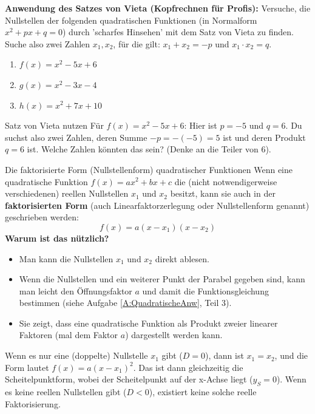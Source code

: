 \begin{aufgabenumgebung}
        \textbf{Anwendung des Satzes von Vieta (Kopfrechnen für Profis):}
        Versuche, die Nullstellen der folgenden quadratischen Funktionen (in Normalform $x^2+px+q=0$) durch 'scharfes Hinsehen' mit dem Satz von Vieta zu finden. Suche also zwei Zahlen $x_1, x_2$, für die gilt: $x_1+x_2 = -p$ und $x_1 \cdot x_2 = q$.
        \begin{enumerate}[label=(\alph*)]
            \item $f(x) = x^2 - 5x + 6$
            \item $g(x) = x^2 - 3x - 4$
            \item $h(x) = x^2 + 7x + 10$
        \end{enumerate}
        \begin{tippumgebung}{Satz von Vieta nutzen}
        Für $f(x) = x^2 - 5x + 6$: Hier ist $p=-5$ und $q=6$. Du suchst also zwei Zahlen, deren Summe $-p = -(-5) = 5$ ist und deren Produkt $q=6$ ist. Welche Zahlen könnten das sein? (Denke an die Teiler von 6).
        \end{tippumgebung}
\end{aufgabenumgebung}

\begin{merksatzumgebung}[label=merksatz:faktorisierte_form_meh]{Die faktorisierte Form (Nullstellenform) quadratischer Funktionen}
Wenn eine quadratische Funktion $f(x)=ax^2+bx+c$ die (nicht notwendigerweise verschiedenen) reellen Nullstellen $x_1$ und $x_2$ besitzt, kann sie auch in der \textbf{faktorisierten Form} (auch Linearfaktorzerlegung oder Nullstellenform genannt) geschrieben werden:
\[ f(x) = a(x-x_1)(x-x_2) \]
\textbf{Warum ist das nützlich?}
\begin{itemize}
    \item Man kann die Nullstellen $x_1$ und $x_2$ direkt ablesen.
    \item Wenn die Nullstellen und ein weiterer Punkt der Parabel gegeben sind, kann man leicht den Öffnungsfaktor $a$ und damit die Funktionsgleichung bestimmen (siehe Aufgabe \ref{A:QuadratischeAnw}, Teil 3).
    \item Sie zeigt, dass eine quadratische Funktion als Produkt zweier linearer Faktoren (mal dem Faktor $a$) dargestellt werden kann.
\end{itemize}
Wenn es nur eine (doppelte) Nullstelle $x_1$ gibt ($D=0$), dann ist $x_1=x_2$, und die Form lautet $f(x)=a(x-x_1)^2$. Das ist dann gleichzeitig die Scheitelpunktform, wobei der Scheitelpunkt auf der x-Achse liegt ($y_S=0$).
Wenn es keine reellen Nullstellen gibt ($D<0$), existiert keine solche reelle Faktorisierung.
\end{merksatzumgebung}

